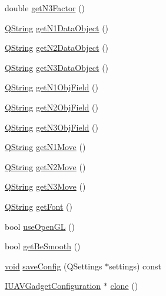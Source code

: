 \begin{DoxyCompactItemize}
\item 
double \hyperlink{group___dial_plugin_gad5c42344ef84fcb60ca310ba8480a141}{get\-N3\-Factor} ()
\item 
\hyperlink{group___u_a_v_objects_plugin_gab9d252f49c333c94a72f97ce3105a32d}{\-Q\-String} \hyperlink{group___dial_plugin_ga47479787c12078cbe5a51eed6ce29254}{get\-N1\-Data\-Object} ()
\item 
\hyperlink{group___u_a_v_objects_plugin_gab9d252f49c333c94a72f97ce3105a32d}{\-Q\-String} \hyperlink{group___dial_plugin_gad43052a508249d44990774c7ec443715}{get\-N2\-Data\-Object} ()
\item 
\hyperlink{group___u_a_v_objects_plugin_gab9d252f49c333c94a72f97ce3105a32d}{\-Q\-String} \hyperlink{group___dial_plugin_gaecd0eec0153c2fbc4ee5715e8f4eb343}{get\-N3\-Data\-Object} ()
\item 
\hyperlink{group___u_a_v_objects_plugin_gab9d252f49c333c94a72f97ce3105a32d}{\-Q\-String} \hyperlink{group___dial_plugin_gaf4bf508f606e67bd5355ed00af142027}{get\-N1\-Obj\-Field} ()
\item 
\hyperlink{group___u_a_v_objects_plugin_gab9d252f49c333c94a72f97ce3105a32d}{\-Q\-String} \hyperlink{group___dial_plugin_ga4a2ae0e302559adb0a0c9e46d885165d}{get\-N2\-Obj\-Field} ()
\item 
\hyperlink{group___u_a_v_objects_plugin_gab9d252f49c333c94a72f97ce3105a32d}{\-Q\-String} \hyperlink{group___dial_plugin_gaa6a05e10dd1da379ed964050e753d1cf}{get\-N3\-Obj\-Field} ()
\item 
\hyperlink{group___u_a_v_objects_plugin_gab9d252f49c333c94a72f97ce3105a32d}{\-Q\-String} \hyperlink{group___dial_plugin_ga694808f332bd385339fa07b6aa6ad67b}{get\-N1\-Move} ()
\item 
\hyperlink{group___u_a_v_objects_plugin_gab9d252f49c333c94a72f97ce3105a32d}{\-Q\-String} \hyperlink{group___dial_plugin_gaa268e84615e3dfe79b2ea85a21015c0f}{get\-N2\-Move} ()
\item 
\hyperlink{group___u_a_v_objects_plugin_gab9d252f49c333c94a72f97ce3105a32d}{\-Q\-String} \hyperlink{group___dial_plugin_ga8b12211d47ec10eb85af4daeecd76cff}{get\-N3\-Move} ()
\item 
\hyperlink{group___u_a_v_objects_plugin_gab9d252f49c333c94a72f97ce3105a32d}{\-Q\-String} \hyperlink{group___dial_plugin_ga2b36383d1efea1dc3848e79d6b73ab32}{get\-Font} ()
\item 
bool \hyperlink{group___dial_plugin_ga71692739b0299dea2c880fc33df5817f}{use\-Open\-G\-L} ()
\item 
bool \hyperlink{group___dial_plugin_ga47cfbeb46101ecdebf8073f133bbbbc1}{get\-Be\-Smooth} ()
\item 
\hyperlink{group___u_a_v_objects_plugin_ga444cf2ff3f0ecbe028adce838d373f5c}{void} \hyperlink{group___dial_plugin_ga77e000666d924bfc77a05a04b30d00f8}{save\-Config} (\-Q\-Settings $\ast$settings) const 
\item 
\hyperlink{group___core_plugin_gacdfdf0b1e39b5002472b76b6564ce51f}{\-I\-U\-A\-V\-Gadget\-Configuration} $\ast$ \hyperlink{group___dial_plugin_ga4cb0aa67ea10afa557dbf083d67f2510}{clone} ()
\end{DoxyCompactItemize}


